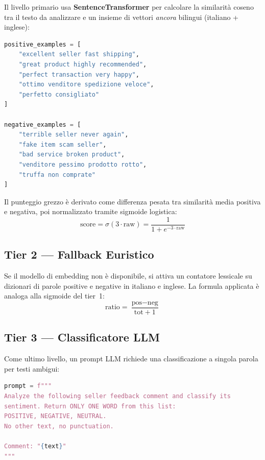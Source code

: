 Il livello primario usa \textbf{SentenceTransformer} per calcolare la
similarità coseno tra il testo da analizzare e un insieme di vettori
\emph{ancora} bilingui (italiano + inglese):

\begin{lstlisting}[language=Python,caption={Anchor vectors per sentiment embedding (app/services/nlp\_sentiment.py)},label=lst:sentiment-anchors]
positive_examples = [
    "excellent seller fast shipping",
    "great product highly recommended",
    "perfect transaction very happy",
    "ottimo venditore spedizione veloce",
    "perfetto consigliato"
]

negative_examples = [
    "terrible seller never again",
    "fake item scam seller",
    "bad service broken product",
    "venditore pessimo prodotto rotto",
    "truffa non comprate"
]
\end{lstlisting}

Il punteggio grezzo è derivato come differenza pesata tra similarità
media positiva e negativa, poi normalizzato tramite sigmoide logistica:
\[ \text{score} = \sigma(3 \cdot \text{raw}) = \frac{1}{1 + e^{-3 \cdot \text{raw}}} \]

\subsection{Tier 2 — Fallback Euristico}
\label{subsec:sentiment-tier2}

Se il modello di embedding non è disponibile, si attiva un contatore
lessicale su dizionari di parole positive e negative in italiano e inglese.
La formula applicata è analoga alla sigmoide del tier~1:
\[ \text{ratio} = \frac{\text{pos} - \text{neg}}{\text{tot} + 1} \]

\subsection{Tier 3 — Classificatore LLM}
\label{subsec:sentiment-tier3}

Come ultimo livello, un prompt LLM richiede una classificazione a
singola parola per testi ambigui:

\begin{lstlisting}[language=Python,caption={Prompt LLM per classificazione sentiment (app/services/nlp\_sentiment.py)},label=lst:sentiment-llm]
prompt = f"""
Analyze the following seller feedback comment and classify its
sentiment. Return ONLY ONE WORD from this list:
POSITIVE, NEGATIVE, NEUTRAL.
No other text, no punctuation.

Comment: "{text}"
"""
\end{lstlisting}

